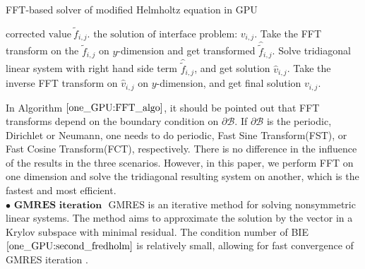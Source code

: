 \begin{algorithm}[ht]
\renewcommand{\algorithmicrequire}{\textbf{Input:}}
\renewcommand{\algorithmicensure}{\textbf{Output:}}
\caption{FFT-based solver of modified Helmholtz equation in GPU}
\begin{algorithmic}[1]
\Require $\text{corrected value}~\tilde{f}_{i,j}$.
\Ensure $\text{the solution of interface problem:} $ $v_{i,j}$.
\State Take the FFT transform on the $\tilde{f}_{i,j}$ on $y$-dimension and get transformed $\hat{\tilde{f}}_{i, j}$.
\State Solve tridiagonal linear system with right hand side term $\hat{\tilde{f}}_{i, j}$, and get solution $\hat{v}_{i, j}$. 
\State Take the inverse FFT transform on $\hat{v}_{i, j}$ on $y$-dimension, and get final solution $v_{i,j}$.
\end{algorithmic}\label{one_GPU:FFT_algo}
\end{algorithm}

In Algorithm $\ref{one_GPU:FFT_algo}$, it should be pointed out that FFT transforms depend on the boundary condition on $\partial \mathcal{B}$. If $\partial \mathcal{B}$ is the periodic, Dirichlet or Neumann, one needs to do periodic, Fast Sine Transform(FST), or Fast Cosine Transform(FCT), respectively. There is no difference in the influence of the results in the three scenarios. However, in this paper, we perform FFT on one dimension and solve the tridiagonal resulting system on another, which is the fastest and most efficient. \\
$\bullet \textbf{ GMRES iteration }$ GMRES is an iterative method for solving nonsymmetric linear systems. The method aims to approximate the solution by the vector in a Krylov subspace with minimal residual. The condition number of BIE $\eqref{one_GPU:second_fredholm}$ is relatively small, allowing for fast convergence of GMRES iteration \cite{saad2003iterative}. 



